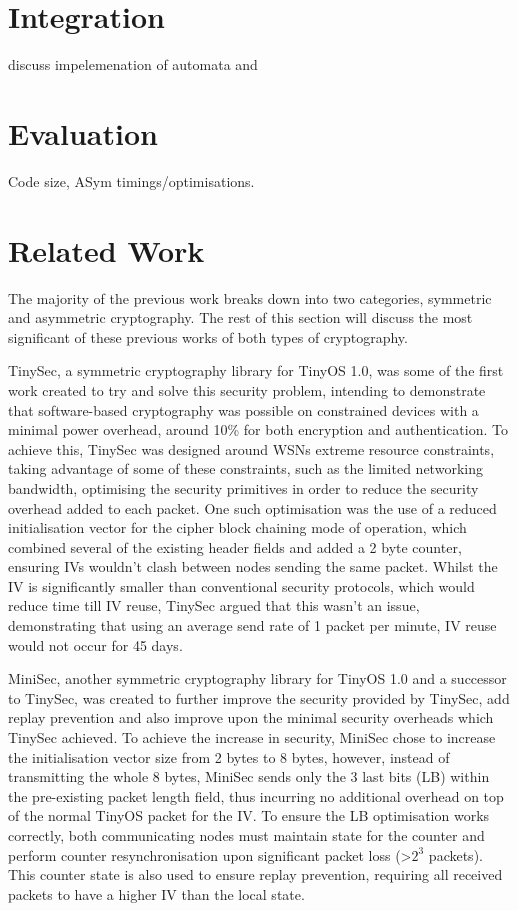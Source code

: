 \documentclass[conference]{./sty/IEEEtran}
\begin{document}
\section{Integration} %
\label{sec:integration}
discuss impelemenation of automata and 

\section{Evaluation} %
\label{sec:evaluation}
Code size, ASym timings/optimisations.

\section{Related Work} %
\label{sec:related_work}
The majority of the previous work breaks down into two categories, symmetric and asymmetric cryptography. The rest of this section will discuss the most significant of these previous works of both types of cryptography.

TinySec\cite{TinySec}, a symmetric cryptography library for TinyOS 1.0, was some of the first work created to try and solve this security problem, intending to demonstrate that software-based cryptography was possible on constrained devices with a minimal power overhead, around 10\% for both encryption and authentication. To achieve this, TinySec was designed around WSNs extreme resource constraints, taking advantage of some of these constraints, such as the limited networking bandwidth, optimising the security primitives in order to reduce the security overhead added to each packet. One such optimisation was the use of a reduced initialisation vector for the cipher block chaining mode of operation, which combined several of the existing header fields and added a 2 byte counter, ensuring IVs wouldn't clash between nodes sending the same packet. Whilst the IV is significantly smaller than conventional security protocols, which would reduce time till IV reuse, TinySec argued that this wasn't an issue, demonstrating that using an average send rate of 1 packet per minute, IV reuse would not occur for 45 days.

MiniSec, another symmetric cryptography library for TinyOS 1.0 and a successor to TinySec, was created to further improve the security provided by TinySec, add replay prevention and also improve upon the minimal security overheads which TinySec achieved. To achieve the increase in security, MiniSec chose to increase the initialisation vector size from 2 bytes to 8 bytes, however, instead of transmitting the whole 8 bytes, MiniSec sends only the 3 last bits (LB) within the pre-existing packet length field, thus incurring no additional overhead on top of the normal TinyOS packet for the IV. To ensure the LB optimisation works correctly, both communicating nodes must maintain state for the counter and perform counter resynchronisation upon significant packet loss (\textgreater$2^3$ packets). This counter state is also used to ensure replay prevention, requiring all received packets to have a higher IV than the local state.
\end{document}
